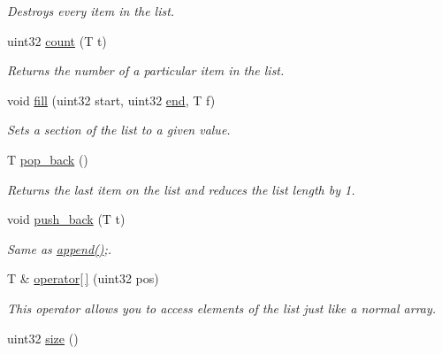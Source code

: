 \begin{DoxyCompactItemize}
\begin{DoxyCompactList}\small\item\em Destroys every item in the list. \end{DoxyCompactList}\item 
uint32 \hyperlink{classetk_1_1_list_a27f50a1845850dd0f19397e4e1bafe08}{count} (T t)
\begin{DoxyCompactList}\small\item\em Returns the number of a particular item in the list. \end{DoxyCompactList}\item 
void \hyperlink{classetk_1_1_list_aa21f417c80d9d8eeed6f33ed5c4af285}{fill} (uint32 start, uint32 \hyperlink{classetk_1_1_list_a19b25cd89872debc07cc002c18845578}{end}, T f)
\begin{DoxyCompactList}\small\item\em Sets a section of the list to a given value. \end{DoxyCompactList}\item 
T \hyperlink{classetk_1_1_list_a85741b89a92238cce95b940ce8a5554e}{pop\-\_\-back} ()
\begin{DoxyCompactList}\small\item\em Returns the last item on the list and reduces the list length by 1. \end{DoxyCompactList}\item 
\hypertarget{classetk_1_1_list_ab7dc844f7e80ac5ea9e7a8923230385a}{void \hyperlink{classetk_1_1_list_ab7dc844f7e80ac5ea9e7a8923230385a}{push\-\_\-back} (T t)}\label{classetk_1_1_list_ab7dc844f7e80ac5ea9e7a8923230385a}

\begin{DoxyCompactList}\small\item\em Same as \hyperlink{classetk_1_1_list_a45df48bc3bb87c2dd26e56f51115ab27}{append()};. \end{DoxyCompactList}\item 
\hypertarget{classetk_1_1_list_acc341d1d8b1b29b7868024777ef15b04}{T \& \hyperlink{classetk_1_1_list_acc341d1d8b1b29b7868024777ef15b04}{operator\mbox{[}$\,$\mbox{]}} (uint32 pos)}\label{classetk_1_1_list_acc341d1d8b1b29b7868024777ef15b04}

\begin{DoxyCompactList}\small\item\em This operator allows you to access elements of the list just like a normal array. \end{DoxyCompactList}\item 
\hypertarget{classetk_1_1_list_aa69eac1c25dcbdedff7f5ce2b7fcaff1}{uint32 \hyperlink{classetk_1_1_list_aa69eac1c25dcbdedff7f5ce2b7fcaff1}{size} ()}\label{classetk_1_1_list_aa69eac1c25dcbdedff7f5ce2b7fcaff1}


\end{DoxyCompactItemize}
